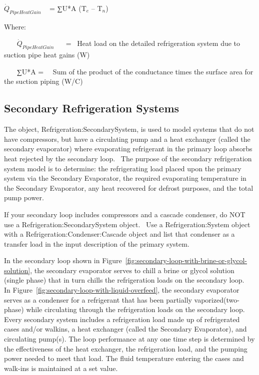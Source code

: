 \({\dot Q_{PipeHeatGain}}\) ~ = ∑U*A (T\(_{e}\) -- T\(_{n}\))

Where:

~~~ \({\dot Q_{PipeHeatGain}}\) ~~ = ~Heat load on the detailed refrigeration system due to suction pipe heat gains (W)

~~~ ∑U*A = ~~Sum of the product of the conductance times the surface area for the suction piping (W/C)

\subsection{Secondary Refrigeration Systems}\label{secondary-refrigeration-systems}

The object, Refrigeration:SecondarySystem, is used to model systems that do not have compressors, but have a circulating pump and a heat exchanger (called the secondary evaporator) where evaporating refrigerant in the primary loop absorbs heat rejected by the secondary loop.~ The purpose of the secondary refrigeration system model is to determine: the refrigerating load placed upon the primary system via the Secondary Evaporator, the required evaporating temperature in the Secondary Evaporator, any heat recovered for defrost purposes, and the total pump power.

If your secondary loop includes compressors and a cascade condenser, do NOT use a Refrigeration:SecondarySystem object.~ Use a Refrigeration:System object with a Refrigeration:Condenser:Cascade object and list that condenser as a transfer load in the input description of the primary system.

In the secondary loop shown in Figure~\ref{fig:secondary-loop-with-brine-or-glycol-solution}, the secondary evaporator serves to chill a brine or glycol solution (single phase) that in turn chills the refrigeration loads on the secondary loop.~ In Figure~\ref{fig:secondary-loop-with-liquid-overfeed}, the secondary evaporator serves as a condenser for a refrigerant that has been partially vaporized(two-phase) while circulating through the refrigeration loads on the secondary loop. Every secondary system includes a refrigeration load made up of refrigerated cases and/or walkins, a heat exchanger (called the Secondary Evaporator), and circulating pump(s). The loop performance at any one time step is determined by the effectiveness of the heat exchanger, the refrigeration load, and the pumping power needed to meet that load. The fluid temperature entering the cases and walk-ins is maintained at a set value.

